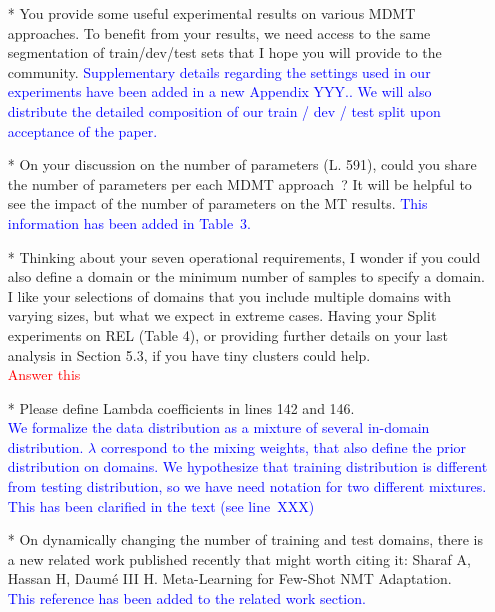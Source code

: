 \documentclass[12pt,times,a4paper,twoside]{article}
\newcommand{\fyTodo}[1]{\Todo[FY:]{\textcolor{orange}{#1}}}
\theoremstyle{definition}
\begin{document}
\begin{itemize}
\item[*] You provide some useful experimental results on various MDMT approaches. To benefit from your results, we need access to the same segmentation of train/dev/test sets that I hope you will provide to the community.
\textcolor{blue}{Supplementary details regarding the settings used in our experiments have been added in a new Appendix YYY.\fyTodo{Fix the appendix.}. We will also distribute the detailed composition of our train / dev / test split upon acceptance of the paper.}
\\
\item[*] On your discussion on the number of parameters (L. 591), could you share the number of parameters per each MDMT approach~? It will be helpful to see  the impact of the number of parameters on the MT results.
  \textcolor{blue}{This information has been added in Table~3\fyTodo{Check number, page and line number and content}.}
\\ 
\item[*] Thinking about your seven operational requirements, I wonder if you could also define a domain or the minimum number of samples to specify a domain. I like your selections of domains that you include multiple domains with varying sizes, but what we expect in extreme cases. Having your Split experiments on REL (Table 4), or providing further details on your last analysis in Section 5.3, if you have tiny clusters could help.\fyTodo{Answer this with more experiments ?}
  \\
  \textcolor{red}{Answer this}
\item[*] Please define Lambda coefficients in lines 142 and 146.
\\
\textcolor{blue}{We formalize the data distribution as a mixture of several in-domain distribution. $\lambda$ correspond to the mixing weights, that also define the prior distribution on domains. We hypothesize that training distribution is different from testing distribution, so we have need notation for two different mixtures. This has been clarified in the text (see line~XXX) \fyTodo{add lines}}
\\
\item[*] On dynamically changing the number of training and test domains, there is a new related work published recently that might worth citing it: Sharaf A, Hassan H, Daumé III H. Meta-Learning for Few-Shot NMT Adaptation.
\\
\textcolor{blue}{This reference has been added to the related work section.}\fyTodo{Add citation}

\end{itemize}
\end{document}
